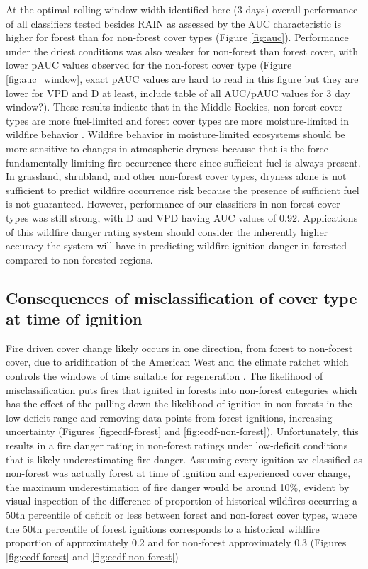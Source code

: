 \documentclass[11p]{article}
\begin{document}
At the optimal rolling window width identified here (3 days) overall performance of all classifiers tested besides RAIN as assessed by the AUC characteristic is higher for forest than for non-forest cover types (Figure \ref{fig:auc}). Performance under the driest conditions was also weaker for non-forest than forest cover, with lower pAUC values observed for the non-forest cover type (Figure \ref{fig:auc_window}, exact pAUC values are hard to read in this figure but they are lower for VPD and D at least, include table of all AUC/pAUC values for 3 day window?). These results indicate that in the Middle Rockies, non-forest cover types are more fuel-limited and forest cover types are more moisture-limited in wildfire behavior \citep{meynEnvironmentalDriversLarge2007}. Wildfire behavior in moisture-limited ecosystems should be more sensitive to changes in atmospheric dryness because that is the force fundamentally limiting fire occurrence there since sufficient fuel is always present. In grassland, shrubland, and other non-forest cover types, dryness alone is not sufficient to predict wildfire occurrence risk because the presence of sufficient fuel is not guaranteed. However, performance of our classifiers in non-forest cover types was still strong, with D and VPD having AUC values of 0.92. Applications of this wildfire danger rating system should consider the inherently higher accuracy the system will have in predicting wildfire ignition danger in forested compared to non-forested regions.  

\subsection{Consequences of misclassification of cover type at time of ignition}

Fire driven cover change likely occurs in one direction, from forest to non-forest cover, due to aridification of the American West and the climate ratchet which controls the windows of time suitable for regeneration \citep{jacksonEcologyRatchetEvents2009}. The likelihood of misclassification puts fires that ignited in forests into non-forest categories which has the effect of the pulling down the likelihood of ignition in non-forests in the low deficit range and removing data points from forest ignitions, increasing uncertainty (Figures \ref{fig:ecdf-forest} and \ref{fig:ecdf-non-forest}). Unfortunately, this results in a fire danger rating in non-forest ratings under low-deficit conditions that is likely underestimating fire danger. Assuming every ignition we classified as non-forest was actually forest at time of ignition and experienced cover change, the maximum underestimation of fire danger would be around 10\%, evident by visual inspection of the difference of proportion of historical wildfires occurring a 50th percentile of deficit or less between forest and non-forest cover types, where the 50th percentile of forest ignitions corresponds to a historical wildfire proportion of approximately 0.2 and for non-forest approximately 0.3 (Figures \ref{fig:ecdf-forest} and \ref{fig:ecdf-non-forest}) 
\end{document}
